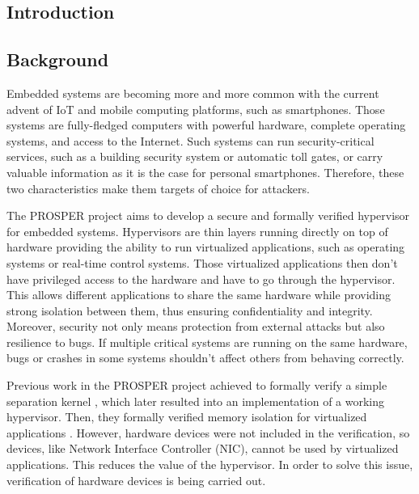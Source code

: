 \documentclass[10pt,a4paper]{article}
\begin{document}
\begin{multicols}{2}


\section{Introduction}

\subsection{Background}

Embedded systems are becoming more and more common with the current advent of {IoT} and mobile computing platforms, such as smartphones. Those systems are fully-fledged computers with powerful hardware, complete operating systems, and access to the Internet. Such systems can run security-critical services, such as a building security system or automatic toll gates, or carry valuable information as it is the case for personal smartphones. Therefore, these two characteristics make them targets of choice for attackers.

The {PROSPER} project \cite{noauthor_prosper:_nodate-1} aims to develop a secure and formally verified hypervisor for embedded systems. Hypervisors are thin layers running directly on top of hardware providing the ability to run virtualized applications, such as operating systems or real-time control systems. Those virtualized applications then don't have privileged access to the hardware and have to go through the hypervisor. This allows different applications to share the same hardware while providing strong isolation between them, thus ensuring confidentiality and integrity. Moreover, security not only means protection from external attacks but also resilience to bugs. If multiple critical systems are running on the same hardware, bugs or crashes in some systems shouldn't affect others from behaving correctly.

Previous work in the {PROSPER} project achieved to formally verify a simple separation kernel \cite{dam_formal_2013}, which later resulted into an implementation of a working hypervisor. Then, they formally verified memory isolation for virtualized applications \cite{nemati_trustworthy_2015}. However, hardware devices were not included in the verification, so devices, like Network Interface Controller ({NIC}), cannot be used by virtualized applications. This reduces the value of the hypervisor. In order to solve this issue, verification of hardware devices is being carried out.


\end{multicols}
\end{document}
